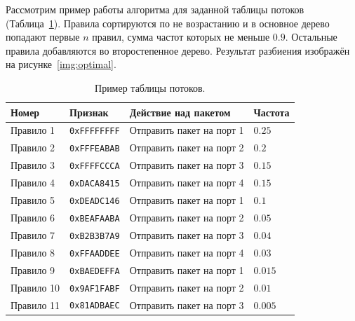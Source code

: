 \documentclass[oneside,final,12pt]{extarticle}
\begin{document}
            Рассмотрим пример работы алгоритма для заданной таблицы потоков (Таблица~\ref{tab:optimal}). 
            Правила сортируются по не возрастанию и в основное дерево попадают первые \(n\) правил,
            сумма частот которых не меньше \(0.9\). Остальные правила добавляются во второстепенное дерево.
            Результат разбиения изображён на рисунке~\ref{img:optimal}.
            \begin{table}
                \centering
                \caption{Пример таблицы потоков.}\label{tab:optimal}
                \begin{tabularx}{\textwidth}{m{2.5cm}m{3.3cm}m{6cm}m{2cm}}%
                    \toprule
                    \bf Номер & \bf Признак & \bf Действие над пакетом & \bf Частота \\
                    \midrule
                    Правило 1 & {\tt 0xFFFFFFFF} & Отправить пакет на порт 1 & \(0.25\) \\
                    Правило 2 & {\tt 0xFFFEABAB} & Отправить пакет на порт 2 & \(0.2\) \\
                    Правило 3 & {\tt 0xFFFFCCCA} & Отправить пакет на порт 3 & \(0.15\) \\
                    Правило 4 & {\tt 0xDACA8415} & Отправить пакет на порт 4 & \(0.15\) \\
                    Правило 5 & {\tt 0xDEADC146} & Отправить пакет на порт 1 & \(0.1\) \\
                    Правило 6 & {\tt 0xBEAFAABA} & Отправить пакет на порт 2 & \(0.05\) \\
                    Правило 7 & {\tt 0xB2B3B7A9} & Отправить пакет на порт 3 & \(0.04\) \\
                    Правило 8 & {\tt 0xFFAADDEE} & Отправить пакет на порт 4 & \(0.03\) \\
                    Правило 9 & {\tt 0xBAEDEFFA} & Отправить пакет на порт 1 & \(0.015\) \\
                    Правило 10 & {\tt 0x9AF1FABF} & Отправить пакет на порт 2 & \(0.01\) \\
                    Правило 11 & {\tt 0x81ADBAEC} & Отправить пакет на порт 3 & \(0.005\) \\
                    \bottomrule
                \end{tabularx}
            \end{table}
            
\end{document}
